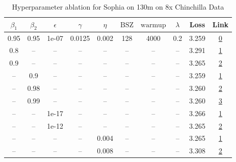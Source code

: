 \begin{table}[H]
\centering
\caption{Hyperparameter ablation for Sophia on 130m on 8x Chinchilla Data}
\label{tab:ablation_sophia_130m_on_8x_chinchilla_data}
\begin{tabular}{cccccccccc}
\toprule
$\beta_1$ & $\beta_2$ & $\epsilon$ & $\gamma$ & $\eta$ & $\mathrm{BSZ}$ & $\mathrm{warmup}$ & $\lambda$ & Loss & Link \\
\midrule
0.95 & 0.95 & 1e-07 & 0.0125 & 0.002 & 128 & 4000 & 0.2 & 3.259 & \href{https://wandb.ai/marin-community/optimizer-scaling/runs/sweep-130m-21B-sophia8d270alr0.002-wd0.2-minlr0-warmup4000-b10.9-728991}{0} \\
\midrule
0.8 & -- & -- & -- & -- & -- & -- & -- & 3.291 & \href{https://wandb.ai/marin-community/optimizer-scaling/runs/sweep-130m-21B-sophiaaa290clr0.002-wd0.2-minlr0-warmup4000-b10.8-82d393}{1} \\
0.9 & -- & -- & -- & -- & -- & -- & -- & 3.265 & \href{https://wandb.ai/marin-community/optimizer-scaling/runs/sweep-130m-21B-sophia87ebc2lr0.002-wd0.2-minlr0-warmup4000-b10.9-e413d1}{2} \\
-- & 0.9 & -- & -- & -- & -- & -- & -- & 3.259 & \href{https://wandb.ai/marin-community/optimizer-scaling/runs/sweep-130m-21B-sophiaa3b59clr0.002-wd0.2-minlr0-warmup4000-b10.9-c08a34}{1} \\
-- & 0.98 & -- & -- & -- & -- & -- & -- & 3.260 & \href{https://wandb.ai/marin-community/optimizer-scaling/runs/sweep-130m-21B-sophia6c3357lr0.002-wd0.2-minlr0-warmup4000-b10.9-daeacb}{2} \\
-- & 0.99 & -- & -- & -- & -- & -- & -- & 3.260 & \href{https://wandb.ai/marin-community/optimizer-scaling/runs/sweep-130m-21B-sophia38a997lr0.002-wd0.2-minlr0-warmup4000-b10.9-184cfb}{3} \\
-- & -- & 1e-17 & -- & -- & -- & -- & -- & 3.266 & \href{https://wandb.ai/marin-community/optimizer-scaling/runs/sweep-130m-21B-sophia50bc78lr0.002-wd0.2-minlr0-warmup4000-b10.9-206787}{1} \\
-- & -- & 1e-12 & -- & -- & -- & -- & -- & 3.265 & \href{https://wandb.ai/marin-community/optimizer-scaling/runs/sweep-130m-21B-sophia80e81dlr0.002-wd0.2-minlr0-warmup4000-b10.9-43e123}{2} \\
-- & -- & -- & -- & 0.004 & -- & -- & -- & 3.265 & \href{https://wandb.ai/marin-community/optimizer-scaling/runs/sweep-130m-21B-sophia25d3f7lr0.004-wd0.2-minlr0-warmup4000-b10.9-28a07e}{1} \\
-- & -- & -- & -- & 0.008 & -- & -- & -- & 3.308 & \href{https://wandb.ai/marin-community/optimizer-scaling/runs/sweep-130m-21B-sophia6ff3cdlr0.008-wd0.2-minlr0-warmup4000-b10.9-7fae63}{2} \\

\end{tabular}
\end{table}
